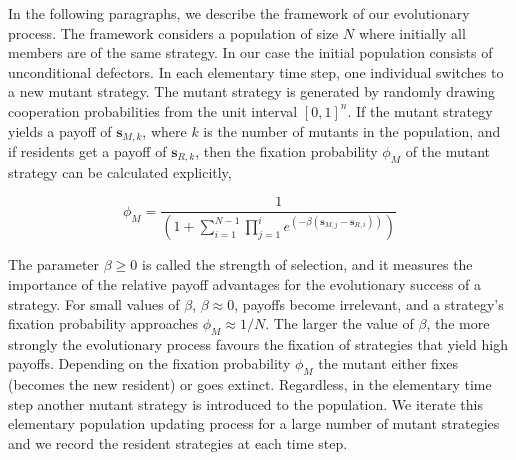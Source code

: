 \documentclass{article}
\theoremstyle{definition}
\begin{document}
In the following paragraphs, we describe the framework of our evolutionary
process. The framework considers a population of size \(N\) where initially all
members are of the same strategy. In our case the initial population consists of
unconditional defectors. In each elementary time step, one individual switches
to a new mutant strategy. The mutant strategy is generated by randomly drawing
cooperation probabilities from the unit interval \([0,1]^n\). If the mutant
strategy yields a payoff of \(\mathbf{s}_{M, k}\), where \(k\) is the number of
mutants in the population, and if residents get a payoff of \(\mathbf{s}_{R,
k}\), then the fixation probability \(\phi_{M}\) of the mutant strategy can be
calculated explicitly,

\begin{equation}\label{eq:fixation_probability}
  \phi_{M} = \frac{1}{\left(1 + \displaystyle \sum_{i=1}^{N - 1} \prod_{j=1}^{i} e^{(- \beta (\mathbf{s}_{M, j} - \mathbf{s}_{R, i}))} \right)}
\end{equation}

The parameter \(\beta \geq 0\) is called the strength of selection, and it
measures the importance of the relative payoff advantages for the evolutionary
success of a strategy. For small values of \(\beta\), \(\beta \approx 0\),
payoffs become irrelevant, and a strategy's fixation probability approaches
\(\phi_{M} \approx 1 / N\). The larger the value of \(\beta\), the more strongly
the evolutionary process favours the fixation of strategies that yield high
payoffs.
Depending on the fixation probability \(\phi_{M}\) the mutant either fixes
(becomes the new resident) or goes extinct. Regardless, in the elementary time
step another mutant strategy is introduced to the  population. We iterate this
elementary population updating process for a large number of mutant strategies
and we record the resident strategies at each time step.

{\setlength{\bibsep}{0\baselineskip}


}
\end{document}
